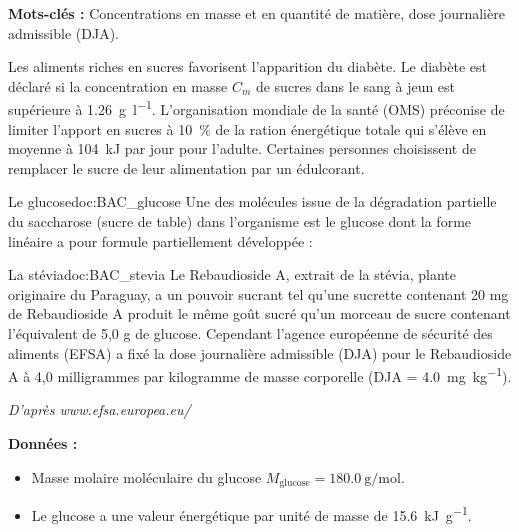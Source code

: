 
\textbf{Mots-clés :} Concentrations en masse et en quantité de matière, dose journalière
admissible (DJA).
\medskip

Les aliments riches en sucres favorisent l'apparition du diabète. Le diabète est déclaré si la
concentration en masse $C_m$ de sucres dans le sang à jeun est supérieure à \qty{1,26}{\g\per\litre}.
L'organisation mondiale de la santé (OMS) préconise de limiter l'apport en sucres à \qty{10}{\percent} de la ration énergétique totale qui s'élève en moyenne à \qty{104}{\kilo\joule} par jour pour l'adulte.
Certaines personnes choisissent de remplacer le sucre de leur alimentation par un édulcorant.

\begin{doc}{Le glucose}{doc:BAC_glucose}
  Une des molécules issue de la dégradation partielle du saccharose (sucre de table)
  dans l'organisme est le glucose dont la forme linéaire a pour formule partiellement développée :
  \begin{center}
  \end{center}
\end{doc}

\begin{doc}{La stévia}{doc:BAC_stevia}
  Le Rebaudioside A, extrait de la stévia, plante originaire du Paraguay, a un pouvoir sucrant tel
  qu'une sucrette contenant 20 mg de Rebaudioside A produit le même goût sucré qu'un morceau
  de sucre contenant l'équivalent de 5,0 g de glucose.
  Cependant l'agence européenne de sécurité des aliments (EFSA)
  a fixé la dose journalière admissible (DJA)
  pour le Rebaudioside A à 4,0 milligrammes par kilogramme de masse corporelle
  (DJA = \qty{4,0}{\milli\g\per\kg}).

  \begin{flushright}
    \textit{D'après www.efsa.europea.eu/}
  \end{flushright}
\end{doc}

\textbf{Données :}
\begin{itemize}
  \item Masse molaire moléculaire du glucose $M_\text{glucose} = \qty{180,0}{\g\per\mol}$.
  \item Le glucose a une valeur énergétique par unité de masse de \qty{15,6}{\kilo\joule\per\g}.
\end{itemize}

